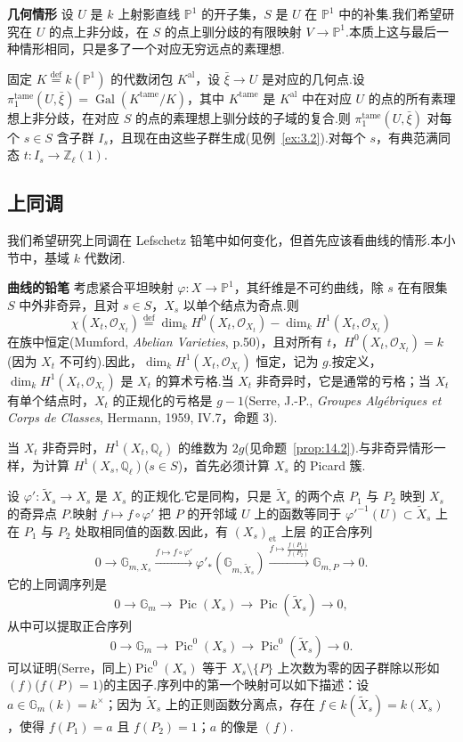 \textbf{几何情形} 设 $U$ 是 $k$ 上射影直线 $\mathbb{P}^{1}$ 的开子集，$S$ 是 $U$ 在 $\mathbb{P}^{1}$ 中的补集.我们希望研究在 $U$ 的点上非分歧，在 $S$ 的点上驯分歧的有限映射 $V \to \mathbb{P}^{1}$.本质上这与最后一种情形相同，只是多了一个对应无穷远点的素理想.

固定 $K \overset{\mathrm{def}}{=} k(\mathbb{P}^{1})$ 的代数闭包 $K^{\mathrm{al}}$，设 $\bar{\xi} \to U$ 是对应的几何点.设 $\pi^{\mathrm{tame}}_1(U, \bar{\xi}) = \operatorname{Gal}(K^{\mathrm{tame}}/K)$，其中 $K^{\mathrm{tame}}$ 是 $K^{\mathrm{al}}$ 中在对应 $U$ 的点的所有素理想上非分歧，在对应 $S$ 的点的素理想上驯分歧的子域的复合.则 $\pi^{\mathrm{tame}}_1(U, \bar{\xi})$ 对每个 $s \in S$ 含子群 $I_s$，且现在由这些子群生成(见例~\ref{ex:3.2}).对每个 $s$，有典范满同态 $t \colon I_s \to \mathbb{Z}_{\ell}(1)$.

\subsection*{上同调}

我们希望研究上同调在 Lefschetz 铅笔中如何变化，但首先应该看曲线的情形.本小节中，基域 $k$ 代数闭.

\textbf{曲线的铅笔} 考虑紧合平坦映射 $\varphi \colon X \to \mathbb{P}^{1}$，其纤维是不可约曲线，除 $s$ 在有限集 $S$ 中外非奇异，且对 $s \in S$，$X_s$ 以单个结点为奇点.则
\[
\chi(X_t, \mathcal{O}_{X_t}) \overset{\mathrm{def}}{=} \dim_k H^{0}(X_t, \mathcal{O}_{X_t}) - \dim_k H^{1}(X_t, \mathcal{O}_{X_t})
\]
在族中恒定(Mumford, \emph{Abelian Varieties}, p.50)，且对所有 $t$，$H^{0}(X_t, \mathcal{O}_{X_t}) = k$(因为 $X_t$ 不可约).因此，$\dim_k H^{1}(X_t, \mathcal{O}_{X_t})$ 恒定，记为 $g$.按定义，$\dim_k H^{1}(X_t, \mathcal{O}_{X_t})$ 是 $X_t$ 的算术亏格.当 $X_t$ 非奇异时，它是通常的亏格；当 $X_t$ 有单个结点时，$X_t$ 的正规化的亏格是 $g - 1$(Serre, J.-P., \emph{Groupes Alg\'ebriques et Corps de Classes}, Hermann, 1959, IV.7，命题 3).

当 $X_t$ 非奇异时，$H^{1}(X_t, \mathbb{Q}_{\ell})$ 的维数为 $2g$(见命题~\ref{prop:14.2}).与非奇异情形一样，为计算 $H^{1}(X_s, \mathbb{Q}_{\ell})$($s \in S$)，首先必须计算 $X_s$ 的 Picard 簇.

设 $\varphi' \colon \widetilde{X}_s \to X_s$ 是 $X_s$ 的正规化.它是同构，只是 $\widetilde{X}_s$ 的两个点 $P_1$ 与 $P_2$ 映到 $X_s$ 的奇异点 $P$.映射 $f \mapsto f \circ \varphi'$ 把 $P$ 的开邻域 $U$ 上的函数等同于 $\varphi'^{-1}(U) \subset \widetilde{X}_s$ 上在 $P_1$ 与 $P_2$ 处取相同值的函数.因此，有 $(X_s)_{\mathrm{et}}$ 上层 的正合序列
\[
0 \to \mathbb{G}_{m, X_s} \xrightarrow{f \mapsto f \circ \varphi'} \varphi'_*(\mathbb{G}_{m, \widetilde{X}_s}) \xrightarrow{f \mapsto \frac{f(P_1)}{f(P_2)}} \mathbb{G}_{m, P} \to 0.
\]
它的上同调序列是
\[
0 \to \mathbb{G}_{m} \to \operatorname{Pic}(X_s) \to \operatorname{Pic}(\widetilde{X}_s) \to 0,
\]
从中可以提取正合序列
\[
0 \to \mathbb{G}_{m} \to \operatorname{Pic}^{0}(X_s) \to \operatorname{Pic}^{0}(\widetilde{X}_s) \to 0.
\]
可以证明(Serre，同上)$\operatorname{Pic}^{0}(X_s)$ 等于 $X_s \setminus \{P\}$ 上次数为零的因子群除以形如 $(f)$($f(P) = 1$)的主因子.序列中的第一个映射可以如下描述：设 $a \in \mathbb{G}_{m}(k) = k^{\times}$；因为 $\widetilde{X}_s$ 上的正则函数分离点，存在 $f \in k(\widetilde{X}_s) = k(X_s)$，使得 $f(P_1) = a$ 且 $f(P_2) = 1$；$a$ 的像是 $(f)$.

